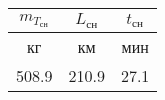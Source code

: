 \begin{tabular}{|c|c|c|}
\hline
$m_{T_{сн}}$ & $L_{сн}$ & $t_{сн}$ \\ 
\hline
кг & км & мин \\ 
\hline
508.9 & 210.9 & 27.1 \\ 
\hline
\end{tabular}